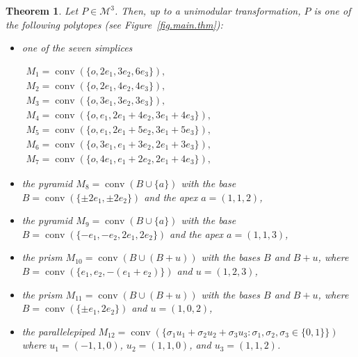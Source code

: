 \documentclass[a4paper]{article}
\theoremstyle{plain}
\newtheorem{theorem}[nn]{Theorem}
\begin{document}
\begin{theorem} \label{main.thm}
Let $P \in {\mathcal{M}^3}$.
Then, up to a unimodular transformation, $P$ is one of the
following polytopes (see Figure~\ref{fig.main.thm}):
\begin{itemize}
  \item one of the seven simplices
    \begin{center}
      $\begin{array}{l}
        M_1 = {{\mathop{\mathrm{{conv}}}}}(\{o,2e_1,3e_2,6e_3\}), \\
        M_2 = {{\mathop{\mathrm{{conv}}}}}(\{o,2e_1,4e_2,4e_3\}), \\
        M_3 = {{\mathop{\mathrm{{conv}}}}}(\{o,3e_1,3e_2,3e_3\}), \\
        M_4 = {{\mathop{\mathrm{{conv}}}}}(\{o,e_1,2e_1+4e_2,3e_1+4e_3\}), \\
        M_5 = {{\mathop{\mathrm{{conv}}}}}(\{o,e_1,2e_1+5e_2,3e_1+5e_3\}), \\
        M_6 = {{\mathop{\mathrm{{conv}}}}}(\{o,3e_1,e_1+3e_2,2e_1+3e_3\}), \\
        M_7 = {{\mathop{\mathrm{{conv}}}}}(\{o,4e_1,e_1+2e_2,2e_1+4e_3\}),
      \end{array}$
    \end{center}
  \item the pyramid $M_8 = {{\mathop{\mathrm{{conv}}}}}(B \cup \{a\})$ with the base
        $B = {{\mathop{\mathrm{{conv}}}}}(\{ \pm 2e_1, \pm 2e_2 \})$ and the apex 
        $a = (1,1,2)$,
  \item the pyramid $M_9 = {{\mathop{\mathrm{{conv}}}}}(B \cup \{a\})$ with the base
        $B = {{\mathop{\mathrm{{conv}}}}}(\{-e_1,-e_2,2e_1,2e_2\})$ and the
        apex $a = (1,1,3)$,
  \item the prism $M_{10} = {{\mathop{\mathrm{{conv}}}}} (B \cup (B+u))$ with the
        bases $B$ and $B+u$, where $B = {{\mathop{\mathrm{{conv}}}}}(\{ e_1, e_2,
        -(e_1+e_2) \})$ and $u =  (1,2,3)$,
  \item the prism $M_{11}= {{\mathop{\mathrm{{conv}}}}}(B \cup (B+u))$ with the
        bases $B$ and $B+u$, where $B = {{\mathop{\mathrm{{conv}}}}}(\{ \pm e_1,
        2e_2\})$ and $u = (1,0,2)$,
  \item the parallelepiped $M_{12} = {{\mathop{\mathrm{{conv}}}}}(\{\sigma_1 u_1 +
         \sigma_2 u_2 + \sigma_3 u_3: \sigma_1, \sigma_2,
         \sigma_3 \in \{0,1\}\})$ where $u_1 = (-1,1,0)$,
         $u_2 = (1,1,0)$, and $u_3 = (1,1,2)$.
\end{itemize}


\end{theorem}
\end{document}
